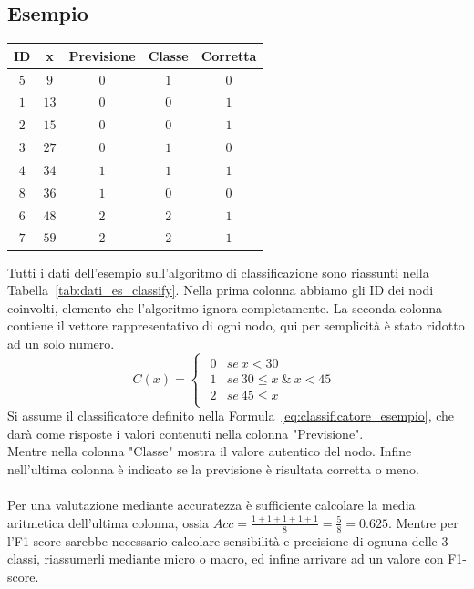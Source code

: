 \subsection{Esempio}
\begin{center}
	\begin{tabular}{|c|c|c|c|c|}
		\hline
		ID & x & Previsione & Classe & Corretta\\
		\hline
		$5$ & $9$ & $0$ & $1$ & $0$\\
		$1$ & $13$ & $0$ & $0$ & $1$\\
		$2$ & $15$ & $0$ & $0$ & $1$\\
		$3$ & $27$ & $0$ & $1$ & $0$\\
		$4$ & $34$ & $1$ & $1$ & $1$\\
		$8$ & $36$ & $1$ & $0$ & $0$\\
		$6$ & $48$ & $2$ & $2$ & $1$\\
		$7$ & $59$ & $2$ & $2$ & $1$\\
		\hline
	\end{tabular}
	\label{tab:dati_es_classify}
\end{center}
Tutti i dati dell'esempio sull'algoritmo di classificazione sono riassunti nella Tabella~\ref{tab:dati_es_classify}. Nella prima colonna abbiamo gli ID dei nodi coinvolti, elemento che l'algoritmo ignora completamente. La seconda colonna contiene il vettore rappresentativo di ogni nodo, qui per semplicità è stato ridotto ad un solo numero.
%
\begin{equation}
	C(x)=
		\begin{cases}
			\begin{array}{ll}
				0 & se \ x < 30\\
				1 & se \ 30 \leq x \ \&\  x < 45\\
				2 & se \ 45 \leq x
			\end{array}
		\end{cases}
	\label{eq:classificatore_esempio}
\end{equation}
%
Si assume il classificatore definito nella Formula~\ref{eq:classificatore_esempio}, che darà come risposte i valori contenuti nella colonna "Previsione".\\
Mentre nella colonna "Classe" mostra il valore autentico del nodo. Infine nell'ultima colonna è indicato se la previsione è risultata corretta o meno.\\
\\
Per una valutazione mediante accuratezza è sufficiente calcolare la media aritmetica dell'ultima colonna, ossia $\displaystyle Acc = \frac{1+1+1+1+1}{8} = \frac{5}{8} = 0.625$. Mentre per l'F1-score sarebbe necessario calcolare sensibilità e precisione di ognuna delle 3 classi, riassumerli mediante micro o macro, ed infine arrivare ad un valore con F1-score.
%
